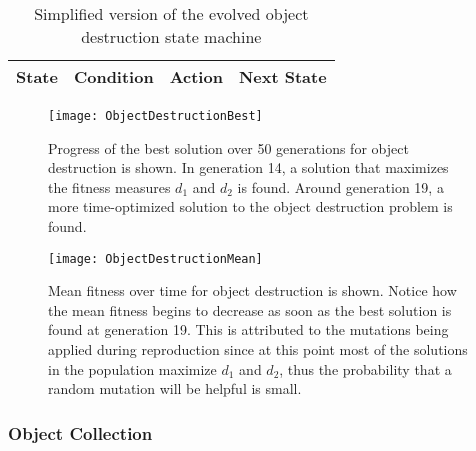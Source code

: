 \begin{table}[ht]
  \centering
  \small
  \begin{tabular}{|c|c|p{25ex}|c|}
    \hline
    State & Condition & Action & Next State \\
    \hline
    
  \end{tabular}
  \normalsize
  \caption{Simplified version of the evolved object destruction state machine}
  \label{tab:DestructionAlgorithmReduced}
\end{table}

\begin{figure}[f]
  \centering
  \texttt{[image: ObjectDestructionBest]}
  \caption[Progress of the best solution over 50 generations for object destruction.]{Progress of the best solution over 50 generations for object destruction is shown.  In generation 14, a solution that maximizes the fitness measures $d_1$ and $d_2$ is found.  Around generation 19, a more time-optimized solution to the object destruction problem is found.}
  \label{fig:DestructionBest}

  \vspace{.02\textheight}

  \texttt{[image: ObjectDestructionMean]}
  \caption[Mean fitness over time for object destruction.]{Mean fitness over time for object destruction is shown.  Notice how the mean fitness begins to decrease as soon as the best solution is found at generation 19.  This is attributed to the mutations being applied during reproduction since at this point most of the solutions in the population maximize $d_1$ and $d_2$, thus the probability that a random mutation will be helpful is small.}
  \label{fig:DestructionMean}
\end{figure}

\clearpage


\subsubsection{Object Collection}

